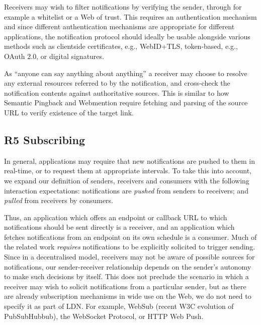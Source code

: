 \documentclass[a4paper]{llncs}
\begin{document}
\par Receivers may wish to filter notifications by verifying the sender, through for example a whitelist or a Web of trust. This requires an authentication mechanism and since different authentication mechanisms are appropriate for different applications, the notification protocol should ideally be usable alongside various methods such as clientside certificates, e.g., WebID+TLS, token-based, e.g., OAuth 2.0, or digital signatures.


\par As ``anyone can say anything about anything'' a receiver may choose to resolve any external resources referred to by the notification, and cross-check the notification contents against authoritative sources. This is similar to how Semantic Pingback and Webmention require fetching and parsing of the source URL to verify existence of the target link.





                                \subsection{R5 Subscribing}
  \label{subscribing}



\par In general, applications may require that new notifications are pushed to them in real-time, or to request them at appropriate intervals. To take this into account, we expand our definition of senders, receivers and consumers with the following interaction expectations: notifications are {\em pushed} from senders to receivers; and {\em pulled} from receivers by consumers.


\par Thus, an application which offers an endpoint or callback URL to which notifications should be sent directly is a receiver, and an application which fetches notifications from an endpoint on its own schedule is a consumer. Much of the related work {\em requires} notifications to be explicitly solicited to trigger sending. Since in a decentralised model, receivers may not be aware of possible sources for notifications, our sender-receiver relationship depends on the sender’s autonomy to make such decisions by itself. This does not preclude the scenario in which a receiver may wish to solicit notifications from a particular sender, but as there are already subscription mechanisms in wide use on the Web, we do not need to specify it as part of LDN. For example, \empty WebSub (recent W3C evolution of PubSubHubbub), the WebSocket Protocol, or HTTP Web Push.
\end{document}
